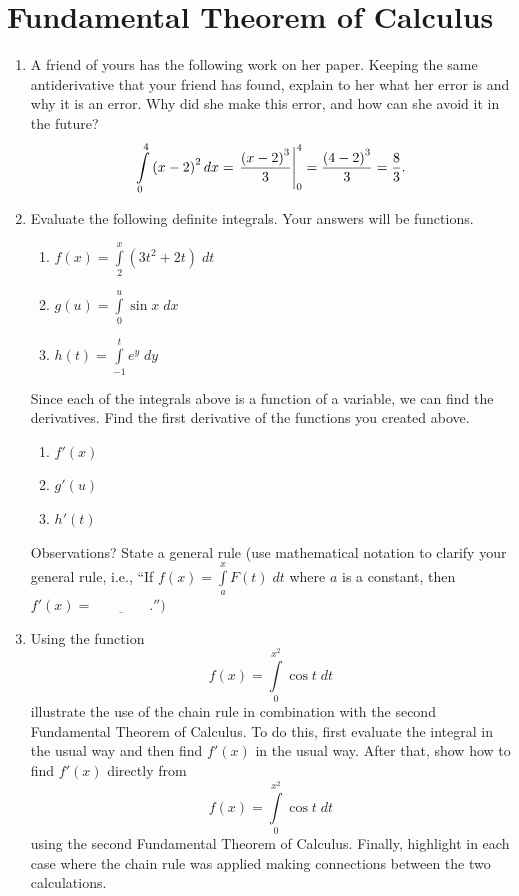 \section{Fundamental Theorem of  Calculus}\begin{enumerate}

\item A friend of yours has the following work on her paper.  Keeping the same antiderivative that your friend has found, explain to her what her error is and why it is an error.  Why did she make this error, and how can she avoid it in the future?
$$
\int\limits_0^4 {\left( {x - 2} \right)^2 dx}  = \left. {{{\left( {x - 2} \right)^3 } \over 3}} \right|_0^4  = {{\left( {4 - 2} \right)^3 } \over 3} = {8 \over 3}.
$$


\item   Evaluate the following definite integrals.  Your answers will be functions.
	\begin{enumerate} \item  	$f(x) = \int\limits_2^x {\left( {3t^2  + 2t} \right)\;dt} $	\item	$g(u) = \int\limits_0^u {\sin x\;dx} $	\item	$h(t) = \int\limits_{ - 1}^t {e^y \;dy} $\end{enumerate}
Since each of the integrals above is a function of a variable, we can find the derivatives.  Find the first derivative of the functions you created above.
	\begin{enumerate} \item $f'(x)$  	\item $g'(u)$	\item $h'(t)$\end{enumerate}
Observations?  State a general rule (use mathematical notation to clarify your general rule, i.e., ``If $f(x) = \int\limits_a^x {F(t)\;dt} $ where $a$ is a constant, then $f'(x) = \underline {\quad \quad \quad \quad } .'')$

\item   Using the function $$f(x) = \int\limits_0^{x^2 } {\cos t\;dt} $$ illustrate the use of the chain rule in combination with the second Fundamental Theorem of Calculus.  To do this, first evaluate the integral in the usual way and then find $f'(x)$ in the usual way.  After that, show how to find $f'(x)$ directly from $$f(x) = \int\limits_0^{x^2 } {\cos t\;dt} $$ using the second Fundamental Theorem of Calculus.  Finally, highlight in each case where the chain rule was applied making connections between the two calculations.


\end{enumerate}
